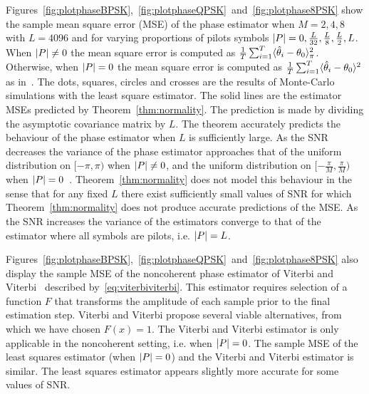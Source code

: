 \documentclass[draftcls, onecolumn, 11pt]{IEEEtran}
\begin{document}
Figures~\ref{fig:plotphaseBPSK},~\ref{fig:plotphaseQPSK}~and~\ref{fig:plotphase8PSK} show the sample mean square error (MSE) of the phase estimator when $M=2,4,8$ with $L=4096$ and for varying proportions of pilots symbols ${\left\vert P \right\vert} = 0, \tfrac{L}{32}, \tfrac{L}{8}, \tfrac{L}{2}, L$.  When ${\left\vert P \right\vert} \neq 0$ the mean square error is computed as $\tfrac{1}{T}\sum_{i=1}^T\langle \hat{\theta}_i - \theta_0 \rangle_\pi^2$.  Otherwise, when ${\left\vert P \right\vert}=0$ the mean square error is computed as $\tfrac{1}{T}\sum_{i=1}^T\langle \hat{\theta}_i - \theta_0 \rangle^2$ as in~\cite{McKilliam_leastsqPSKnoncoICASSP_2012}.  The dots, squares, circles and crosses are the results of Monte-Carlo simulations with the least square estimator.  The solid lines are the estimator MSEs predicted by Theorem~\ref{thm:normality}.   %
The prediction is made by dividing the asymptotic covariance matrix by $L$.  The theorem accurately predicts the behaviour of the phase estimator when $L$ is sufficiently large.  As the SNR decreases the variance of the phase estimator approaches that of the uniform distribution on $[-\pi, \pi)$ when ${\left\vert P \right\vert} \neq 0$, and the uniform distribution on $[-\tfrac{\pi}{M}, \tfrac{\pi}{M})$ when ${\left\vert P \right\vert}=0$~\cite{McKilliam_leastsqPSKnoncoICASSP_2012}.  Theorem~\ref{thm:normality} does not model this behaviour in the sense that for any fixed $L$ there exist sufficiently small values of SNR for which Theorem~\ref{thm:normality} does not produce accurate predictions of the MSE.  As the SNR increases the variance of the estimators converge to that of the estimator where all symbols are pilots, i.e. ${\left\vert P \right\vert} = L$.


Figures~\ref{fig:plotphaseBPSK},~\ref{fig:plotphaseQPSK}~and~\ref{fig:plotphase8PSK} also display the sample MSE of the noncoherent phase estimator of Viterbi and Viterbi~\cite{ViterbiViterbi_phase_est_1983} described by~\eqref{eq:viterbiviterbi}.  This estimator requires selection of a function $F$ that transforms the amplitude of each sample prior to the final estimation step.  %
Viterbi and Viterbi propose several viable alternatives, from which we have chosen $F(x) = 1$.  The Viterbi and Viterbi estimator is only applicable in the noncoherent setting, i.e. when ${\left\vert P \right\vert} = 0$.  The sample MSE of the least squares estimator (when ${\left\vert P \right\vert} = 0$) and the Viterbi and Viterbi estimator is similar.  The least squares estimator appears slightly more accurate for some values of SNR.
\end{document}

